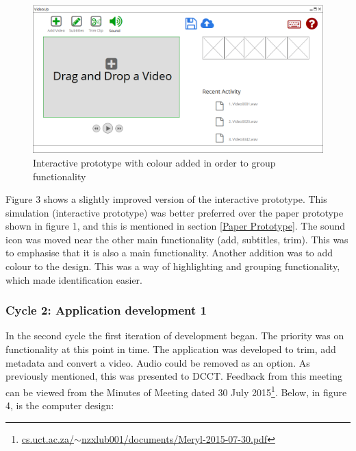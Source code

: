 \documentclass{sig-alternate-05-2015}
\begin{document}
\begin{figure} [h!]
\includegraphics[scale=0.23]{interactive2}
\caption{Interactive prototype with colour added in order to group functionality}
\end{figure}

Figure 3 shows a slightly improved version of the interactive prototype. This simulation (interactive prototype) was better preferred over the paper prototype shown in figure 1, and this is mentioned in section \ref{Paper Prototype}. The sound icon was moved near the other main functionality (add, subtitles, trim). This was to emphasise that it is also a main functionality. Another addition was to add colour to the design. This was a way of highlighting and grouping functionality, which made identification easier.

\subsubsection{Cycle 2: Application development 1}
In the second cycle the first iteration of development began. The priority was on functionality at this point in time. The application was developed to trim, add metadata and convert a video. Audio could be removed as an option. As previously mentioned, this was presented to DCCT. Feedback from this meeting can be viewed from the Minutes of Meeting dated 30 July 2015\footnote{\href{http://people.cs.uct.ac.za/~nzxlub001/documents/Meryl-2015-07-30.pdf}{cs.uct.ac.za/$\sim$nzxlub001/documents/Meryl-2015-07-30.pdf}}. Below, in figure 4, is the computer design:
\end{document}
